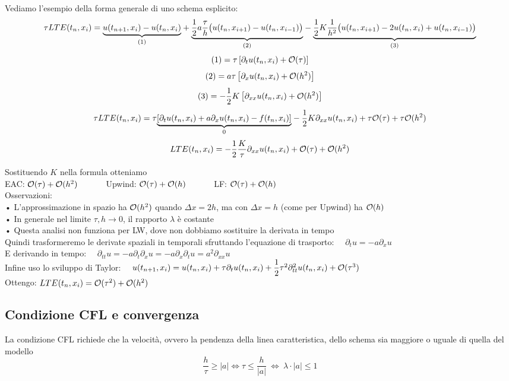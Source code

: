 \documentclass{article}
\begin{document}
Vediamo l'esempio della forma generale  di uno schema esplicito:
\[
\tau LTE(t_n,x_i) = \underset{(1)}{\underbrace{u(t_{n+1},x_i) - u(t_n,x_i)}} + \underset{(2)}{\underbrace{\dfrac{1}{2} a \dfrac{\tau}{h}\big(u(t_n,x_{i+1}) - u(t_n,x_{i-1})\big)}} - \underset{(3)}{\underbrace{ \dfrac12 K \dfrac{1}{h^2} \big(u(t_n,x_{i+1}) - 2u(t_n,x_i) + u(t_n,x_{i-1})\big) }}
\]
\[
(1) = \tau \left[ \partial_t u(t_n,x_i) + \mathcal O(\tau) \right]
\]
\[
(2) = a \tau \left[ \partial_x u(t_n,x_i) + \mathcal O (h^2) \right]
\]
\[
(3) = -\frac12 K \OO \partial_{xx} u(t_n,x_i) + \Oc (h^2) \CC \skipp
\]
\[
\tau LTE(t_n,x_i) = \tau \underset{0}{\underbrace{\left[ \partial_t u(t_n,x_i) + a\partial_x u(t_n,x_i) - f(t_n,x_i) \right]}} - \dfrac12 K\partial_{xx} u(t_n,x_i) + \tau \mathcal O(\tau) + \tau \mathcal O(h^2)
\]
\[
LTE(t_n,x_i) = - \frac12 \frac{K}{\tau}\partial_{xx} u(t_n,x_i) + \Oc(\tau) + \Oc(h^2) \skipp
\]

Sostituendo $K$ nella formula otteniamo\\
EAC: $\mathcal O(\tau)+ \mathcal O(h^2)$ \ \ \ \ \ \ Upwind: $\mathcal O(\tau) + \mathcal O(h)$ \ \ \ \ \ \ LF: $\mathcal O(\tau) + \mathcal O(h)$\\

Osservazioni:\\
• L'approssimazione in spazio ha $\mathcal O(h^2)$ quando $\Delta x=2h$, ma con $\Delta x=h$ (come per Upwind) ha $\mathcal O(h)$\\
• In generale nel limite $\tau, h \to 0$, il rapporto $\lambda$ è costante\\

• Questa analisi non funziona per LW, dove non dobbiamo sostituire la derivata in tempo\\
Quindi trasformeremo le derivate spaziali in temporali sfruttando l'equazione di trasporto: \ \ $\partial_t u= -a\partial_x u$\\
E derivando in tempo: \ \ $\partial_{tt} u = -a\partial_t\partial_x u = - a\partial_x\partial_t u = a^2 \partial_{xx} u $\\
Infine uso lo sviluppo di Taylor: \ \ $u(t_{n+1},x_i)= u(t_n,x_i) + \tau \partial_t u(t_n,x_i) + \dfrac12 \tau^2 \partial_{tt}^2 u(t_n,x_i) + \mathcal O(\tau^3)$\\
Ottengo: $LTE(t_n,x_i) = \mathcal O(\tau^2) + \mathcal O(h^2)$\\




\subsection{Condizione CFL e convergenza}

La condizione CFL richiede che la velocità, ovvero la pendenza della linea caratteristica, dello schema sia maggiore o uguale di quella del modello
\[
\frac{h}{\tau} \ge |a| \Longleftrightarrow \tau \le \frac{h}{|a|} \ \Longleftrightarrow \ \lambda\cdot |a| \le 1 
\]
\phantom{}
\end{document}
